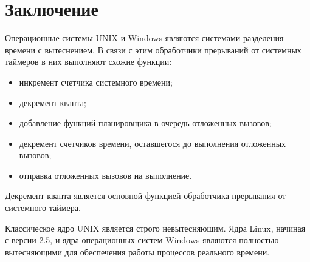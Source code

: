 \documentclass[a4paper,oneside,14pt]{extreport}
\begin{document}
\chapter*{Заключение}

Операционные системы UNIX и Windows являются системами разделения времени с вытеснением. В связи с этим обработчики прерываний от системных таймеров в них выполняют схожие функции:
\begin{itemize}
	\item инкремент счетчика системного времени;
	\item декремент кванта;
	\item добавление функций планировщика в очередь отложенных вызовов;
	\item декремент счетчиков времени, оставшегося до выполнения отложенных вызовов;
	\item отправка отложенных вызовов на выполнение.
\end{itemize}

Декремент кванта является основной функцией обработчика прерывания от системного таймера.

Классическое ядро UNIX является строго невытесняющим. Ядра Linux, начиная с версии 2.5, и ядра операционных систем Windows являются полностью вытесняющими для обеспечения работы процессов реального времени.
\end{document}
